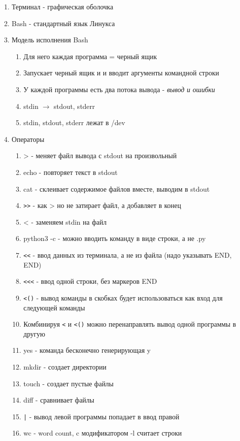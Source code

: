 \documentclass[a4paper, 12pt]{article}
\begin{document}
\begin{enumerate}
  \item Терминал - графическая оболочка
  \item Bash - стандартный язык Линукса
  \item Модель исполнения Bash
  \begin{enumerate}
    \item Для него каждая программа = черный ящик
    \item Запускает черный ящик и и вводит аргументы командной строки
    \item У каждой программы есть два потока вывода - \textit{вывод и ошибки}
    \item stdin $\rightarrow$ stdout, stderr
    \item stdin, stdout, stderr лежат в /dev
  \end{enumerate}
  \item Операторы
  \begin{enumerate}
    \item > - меняет файл вывода с stdout на произвольный
    \item echo - повторяет текст в stdout
    \item cat - склеивает содержимое файлов вместе, выводим в stdout
    \item \verb|>>| - как > но не затирает файл, а добавляет в конец
    \item < - заменяем stdin на файл
    \item python3 -c - можно вводить команду в виде строки, а не .py
    \item \verb|<<| - ввод данных из терминала, а не из файла (надо указывать END, END)
    \item \verb|<<<| - ввод одной строки, без маркеров END
    \item \verb|<()| - вывод команды в скобках будет использоваться как вход для следующей команды
    \item Комбинируя \verb|<| и \verb|<()| можно перенаправлять вывод одной программы в другую
    \item yes - команда бесконечно генерирующая y
    \item mkdir - создает директории
    \item touch - создает пустые файлы
    \item diff - сравнивает файлы
    \item \verb+|+ - вывод левой программы попадает в ввод правой
    \item wc - word count, c модификатором -l считает строки

\end{enumerate}
\end{enumerate}
\end{document}
